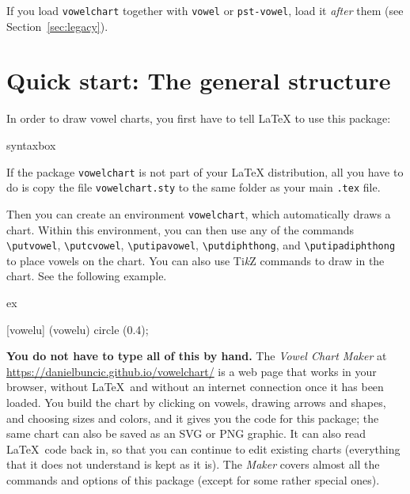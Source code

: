 \documentclass[a4paper,11pt]{article}
\newcommand\cmd[1]{\texttt{\textbackslash #1}}
\newcommand\pkg[1]{\texttt{#1}}
\begin{document}
If you load \pkg{vowelchart} together with \pkg{vowel} or \pkg{pst-vowel}, load it \emph{after} them (see Section~\ref{sec:legacy}).




\section{Quick start: The general structure}

In order to draw vowel charts, you first have to tell \LaTeX{} to use this package:
\begin{tcblisting}{syntaxbox}
\usepackage{vowelchart}
\end{tcblisting}

\noindent
If the package \pkg{vowelchart} is not part of your \LaTeX{} distribution, all you have to do is copy the file \pkg{vowelchart.sty} to the same folder as your main \pkg{.tex} file.

Then you can create an environment \pkg{vowelchart}, which automatically draws a chart.
Within this environment, you can then use any of the commands \cmd{putvowel}, \cmd{putcvowel}, \cmd{putipavowel}, \cmd{putdiphthong}, and \cmd{putipadiphthong} to place vowels on the chart.
You can also use Ti\textit{k}Z commands to draw in the chart.
See the following example.

\begin{tcblisting}{ex}
\begin{vowelchart}
  [vowelu]
   (vowelu) circle (0.4);
\end{vowelchart}
\end{tcblisting}

\noindent
\textbf{You do not have to type all of this by hand.} The \emph{Vowel Chart Maker} at \url{https://danielbuncic.github.io/vowelchart/} is a web page that works in your browser, without \LaTeX\ and without an internet connection once it has been loaded. You build the chart by clicking on vowels, drawing arrows and shapes, and choosing sizes and colors, and it gives you the code for this package; the same chart can also be saved as an SVG or PNG graphic. It can also read \LaTeX\ code back in, so that you can continue to edit existing charts (everything that it does not understand is kept as it is). The \textit{Maker} covers almost all the commands and options of this package (except for some rather special ones).
\end{document}
